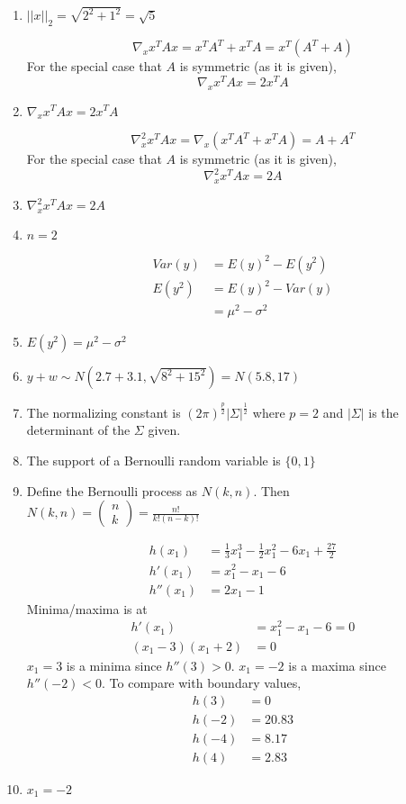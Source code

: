 \documentclass[11pt]{scrartcl}
\begin{document}
\begin{enumerate}
\item $||x||_2 = \sqrt{2^2 + 1^2} = \sqrt{5}$

\[\nabla_x x^T Ax = x^T A^T + x^T A = x^T (A^T + A)\]
For the special case that $A$ is symmetric (as it is given), 
\[\nabla_x x^T Ax = 2x^T A\]
\item $\nabla_x x^T Ax = 2x^T A$

\[\nabla_x^2 x^T Ax = \nabla_x \left(x^T A^T + x^T A \right) = A + A^T\]
For the special case that $A$ is symmetric (as it is given),
\[\nabla_x^2 x^T Ax = 2A\]
\item $\nabla_x^2 x^T Ax = 2A$

\item $n=2$

\begin{align*}
Var(y) &= E(y)^2 - E(y^2) \\
E(y^2) &= E(y)^2 - Var(y) \\
&= \mu^2 - \sigma^2
\end{align*}
\item $E(y^2) = \mu^2 - \sigma^2$

\item $y + w \sim N(2.7 + 3.1, \sqrt{8^2 + 15^2}) = N(5.8, 17)$

\item The normalizing constant is $(2\pi)^{\frac{p}{2}} |\Sigma|^{\frac{1}{2}}$ where $p=2$ and $|\Sigma|$ is the determinant of the $\Sigma$ given.

\item The support of a Bernoulli random variable is $\{0,1\}$

\item Define the Bernoulli process as $N(k,n)$. Then $N(k,n) = \begin{pmatrix}n \\ k\end{pmatrix} = \frac{n!}{k!(n-k)!}$

\begin{align*}
h(x_1) &= \frac{1}{3}x_1^3 - \frac{1}{2}x_1^2 - 6x_1 + \frac{27}{2} \\
h'(x_1) &= x_1^2 - x_1 - 6 \\
h''(x_1) &= 2x_1 - 1
\end{align*}
Minima/maxima is at
\begin{align*}
h'(x_1) &= x_1^2 - x_1 - 6 = 0 \\
(x_1 - 3)(x_1+2) &= 0
\end{align*}
$x_1 = 3$ is a minima since $h''(3) > 0$. $x_1 = -2$ is a maxima since $h''(-2) < 0$. 
To compare with boundary values, 
\begin{align*}
h(3) &= 0 \\
h(-2) &= 20.83 \\
h(-4) &= 8.17 \\
h(4) &= 2.83 
\end{align*}
\item $x_1 = -2$


\end{enumerate}
\end{document}
